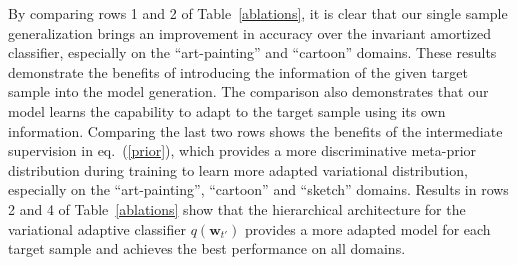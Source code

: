 \documentclass{article} \usepackage[table]{xcolor}
\newcommand{\w}{\mathbf{w}}
\begin{document}
By comparing rows 1 and 2 of Table~\ref{ablations}, it is clear that our single sample generalization brings an improvement in accuracy over the invariant amortized classifier, especially on the ``art-painting'' and ``cartoon'' domains. 
These results demonstrate the benefits of introducing the information of the given target sample into the model generation. The comparison also demonstrates that our model learns the capability to adapt to the target sample using its own information.
Comparing the last two rows shows the benefits of the intermediate supervision in eq.~(\ref{prior}), which provides a more discriminative meta-prior distribution during training to learn more adapted variational distribution, especially on the ``art-painting'', ``cartoon'' and ``sketch'' domains.
Results in rows 2 and 4 of Table~\ref{ablations} show that the hierarchical architecture for the variational adaptive classifier $q(\w_{t'})$ provides a more adapted model for each target sample and achieves the best performance on all domains.
\end{document}
